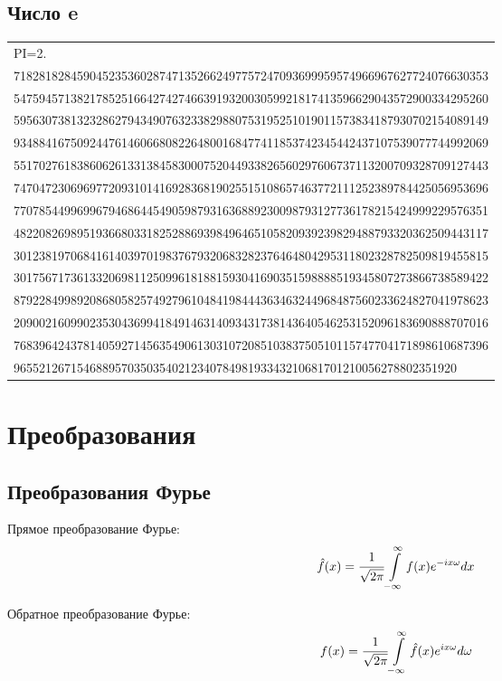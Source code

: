 \documentclass[12pt, a4paper]{article}
\begin{document}
\subsection{Число e}
\begin{tabular}{l}
PI=2.\\
718281828459045235360287471352662497757247093699959574966967627724076630353\\
547594571382178525166427427466391932003059921817413596629043572900334295260\\
595630738132328627943490763233829880753195251019011573834187930702154089149\\
934884167509244761460668082264800168477411853742345442437107539077744992069\\
551702761838606261331384583000752044933826560297606737113200709328709127443\\
747047230696977209310141692836819025515108657463772111252389784425056953696\\
770785449969967946864454905987931636889230098793127736178215424999229576351\\
482208269895193668033182528869398496465105820939239829488793320362509443117\\
301238197068416140397019837679320683282376464804295311802328782509819455815\\
301756717361332069811250996181881593041690351598888519345807273866738589422\\
879228499892086805825749279610484198444363463244968487560233624827041978623\\
209002160990235304369941849146314093431738143640546253152096183690888707016\\
768396424378140592714563549061303107208510383750510115747704171898610687396\\
9655212671546889570350354021234078498193343210681701210056278802351920
\end{tabular}

\newpage
\section{Преобразования}
\subsection{Преобразования Фурье}
Прямое преобразование Фурье:
$$ \hat f(x) = \cfrac{1}{\sqrt{2\pi}} \int\limits_{-\infty}^{\infty}{ f(x) e^{-ix\omega} dx} $$

Обратное преобразование Фурье:
$$ f(x) = \cfrac{1}{\sqrt{2\pi}} \int\limits_{-\infty}^{\infty}{ \hat f(x) e^{ix\omega} d\omega} $$
\end{document}
